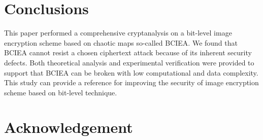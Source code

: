 \documentclass[final,3p,times,twocolumn]{elsarticle}
\begin{document}


\section{Conclusions}


This paper performed a comprehensive cryptanalysis on a bit-level image encryption scheme based on chaotic maps so-called BCIEA. We found that BCIEA cannot resist a chosen ciphertext attack because of its inherent security defects. Both theoretical analysis and experimental verification were provided to support that BCIEA can be broken with low computational and data complexity. This study can provide a reference for improving the security of image encryption scheme based on bit-level technique.


\cite{Shafique2018epjp,MPEanalysis2015infsci,Diaconu2015infsci,Stinson2006,fengw2018ieeepj,wenh2019epjp,zhuzl2011infsci,Lcq:Optimal:SP11,Jolfaei2016TransIFS,Uhl2018Trans,YE2010PRL,fridrich1998symmetric,lic2016sigpro,ozkaynak:review:ND18,shannon1949communication,tengl2017MTA}

\section*{Acknowledgement}




\end{document}
